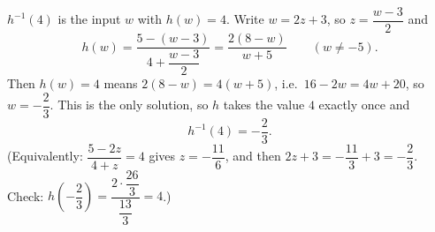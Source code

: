 $h^{-1}(4)$ is the input $w$ with $h(w)=4$. Write $w=2z+3$, so $z=\dfrac{w-3}{2}$ and
\[
h(w)=\dfrac{5-(w-3)}{4+\dfrac{w-3}{2}}=\dfrac{2(8-w)}{w+5}\qquad(w\ne-5).
\]
Then $h(w)=4$ means $2(8-w)=4(w+5)$, i.e.\ $16-2w=4w+20$, so $w=-\dfrac{2}{3}$. This is the only solution, so $h$ takes the value $4$ exactly once and
\[
h^{-1}(4)=\boxed{-\dfrac{2}{3}}.
\]
(Equivalently: $\dfrac{5-2z}{4+z}=4$ gives $z=-\dfrac{11}{6}$, and then $2z+3=-\dfrac{11}{3}+3=-\dfrac{2}{3}$. Check: $h\left(-\dfrac{2}{3}\right)=\dfrac{2\cdot\dfrac{26}{3}}{\dfrac{13}{3}}=4$.)

